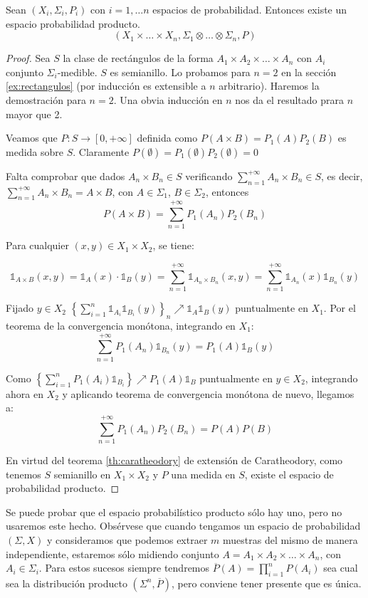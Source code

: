 \begin{theorem}
 Sean $(X_i, \Sigma_i, P_i)$ con $i=1,\ldots n$ espacios de probabilidad. Entonces existe un espacio probabilidad
 producto.
 \[(X_1 \times \ldots \times X_n, \Sigma_1 \otimes \ldots \otimes \Sigma_n, P)\]
\end{theorem}
\begin{proof}
 Sea $S$ la clase de rectángulos de la forma $A_1 \times A_2 \times \ldots \times A_n$ con $A_i$ conjunto 
 $\Sigma_i$-medible. $S$ es semianillo. Lo probamos para $n=2$ en la sección \ref{ex:rectangulos} (por inducción es 
 extensible a $n$ arbitrario). Haremos la demostración para $n=2$. Una obvia inducción en $n$ nos da el 
 resultado prara $n$ mayor que 2.
 
 Veamos que $P:S \rightarrow [0,+\infty]$ definida como $P(A\times B) = P_1(A) P_2(B)$ es medida sobre $S$.
 Claramente $P(\emptyset) = P_1(\emptyset)P_2(\emptyset) = 0$
 
 Falta comprobar que dados $A_n \times B_n \in S$ verificando $\sum_{n=1}^{+\infty} A_n\times B_n \in S$,
 es decir, $\sum_{n=1}^{+\infty} A_n\times B_n = A\times B$, con $A \in \Sigma_1$, $B \in \Sigma_2$, entonces
 \[P(A\times B) = \sum_{n=1}^{+\infty} P_1(A_n) P_2(B_n)\]
 
 Para cualquier $(x,y) \in X_1 \times X_2$, se tiene:
 
 \[\mathds{1}_{A\times B}(x,y) = \mathds{1}_{A}(x)\cdot \mathds{1}_B(y) = \sum_{n=1}^{+\infty} 
 \mathds{1}_{A_n\times B_n}(x,y) = \sum_{n=1}^{+\infty} \mathds{1}_{A_n}(x) \mathds{1}_{B_n}(y) \] 
 
 Fijado $y\in X_2$ $\left\{\sum_{i=1}^{n} \mathds{1}_{A_i}\mathds{1}_{B_i}(y)\right\}_n \nearrow \mathds{1}_A \mathds{1}_B(y)$ 
 puntualmente en $X_1$. Por el teorema de la convergencia monótona, integrando en $X_1$:
 \[\sum_{n=1}^{+\infty} P_1(A_n)\mathds{1}_{B_n}(y) = P_1(A) \mathds{1}_B(y)\]
 
 Como $\left\{\sum_{i=1}^{n} P_1(A_i)\mathds{1}_{B_i}\right\} \nearrow P_1(A) \mathds{1}_B$ puntualmente en $y\in X_2$, 
 integrando ahora en $X_2$ y aplicando teorema de convergencia monótona de nuevo, llegamos a:
 \[\sum_{n=1}^{+\infty} P_1(A_n) P_2(B_n) = P(A) P(B)\]
 
 En virtud del teorema \ref{th:caratheodory} de extensión de Caratheodory, como tenemos $S$ semianillo en 
 $X_1\times X_2$ y $P$ una medida en $S$, existe el espacio de probabilidad producto.
\end{proof}

Se puede probar que el espacio probabilístico producto sólo hay uno, pero no usaremos este hecho. Obsérvese que cuando 
tengamos un espacio de probabilidad $(\Sigma, X)$ y consideramos que podemos extraer $m$ muestras del mismo
de manera independiente, estaremos sólo midiendo conjunto $A=A_1 \times A_2 \times \ldots \times A_n$, con $A_i \in\Sigma_i$.
Para estos sucesos siempre tendremos $\overline{P}(A) = \prod_{i=1}^n P(A_i)$ sea cual sea la distribución producto
$(\Sigma^n, \overline{P})$, pero conviene tener presente que es única.

